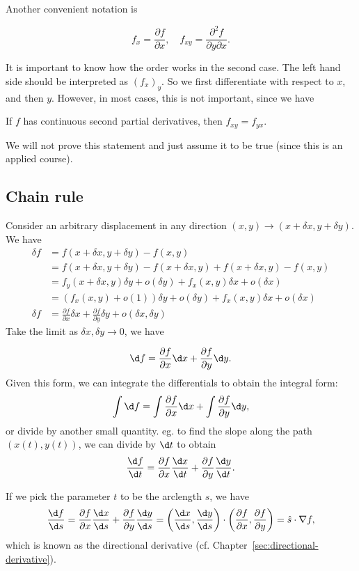 \documentclass[a4paper]{article}
\begin{document}
Another convenient notation is
\begin{notation}
  \[
    f_x = \frac{\partial f}{\partial x},\quad f_{xy} = \frac{\partial^2 f}{\partial y\partial x}.
  \]
\end{notation}
It is important to know how the order works in the second case. The left hand side should be interpreted as $(f_x)_y$. So we first differentiate with respect to $x$, and then $y$. However, in most cases, this is not important, since we have
\begin{thm}
  If $f$ has continuous second partial derivatives, then $f_{xy} = f_{yx}$.
\end{thm}
We will not prove this statement and just assume it to be true (since this is an applied course).

\subsection{Chain rule}
Consider an arbitrary displacement in any direction $(x, y) \to (x+\delta x, y + \delta y)$. We have
\begin{align*}
  \delta f &= f(x+\delta x, y + \delta y) - f(x, y)\\
  &= f(x+\delta x, y + \delta y) - f(x + \delta x, y) + f(x+\delta x, y) - f(x, y)\\
  &= f_y(x + \delta x, y)\delta y + o(\delta y) + f_x(x, y)\delta x + o(\delta x)\\
  &= (f_x(x, y) + o(1))\delta y + o(\delta y) + f_x(x, y)\delta x + o(\delta x)\\
  \delta f&= \frac{\partial f}{\partial x}\delta x + \frac{\partial f}{\partial y}\delta y + o(\delta x, \delta y)
\end{align*}
Take the limit as $\delta x, \delta y \to 0$, we have
\begin{thm}
  \[
    \d f = \frac{\partial f}{\partial x}\d x + \frac{\partial f}{\partial y}\d y.
  \]
  Given this form, we can integrate the differentials to obtain the integral form:
  \[
    \int \d f = \int \frac{\partial f}{\partial x}\d x + \int \frac{\partial f}{\partial y}\d y,
  \]
  or divide by another small quantity. eg. to find the slope along the path $(x(t), y(t))$, we can divide by $\d t$ to obtain
  \[
    \frac{\d f}{\d t} = \frac{\partial f}{\partial x}\frac{\d x}{\d t} + \frac{\partial f}{\partial y}\frac{\d y}{\d t}.
  \]
\end{thm}

If we pick the parameter $t$ to be the arclength $s$, we have
\[
  \frac{\d f}{\d s} = \frac{\partial f}{\partial x}\frac{\d x}{\d s} + \frac{\partial f}{\partial y}\frac{\d y}{\d s} = \left(\frac{\d x}{\d s}, \frac{\d y}{\d s}\right)\cdot \left(\frac{\partial f}{\partial x}, \frac{\partial f}{\partial y}\right) = \hat{s}\cdot \nabla f,
\]
which is known as the directional derivative (cf. Chapter~\ref{sec:directional-derivative}).
\end{document}
